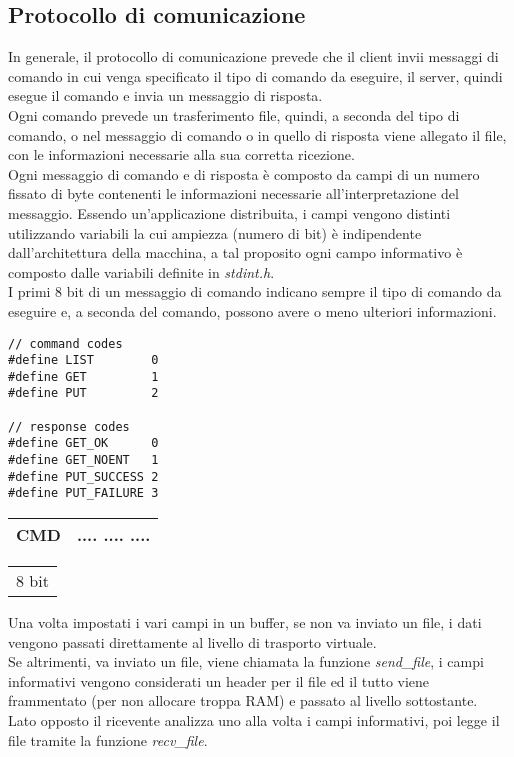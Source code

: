 \subsection{Protocollo di comunicazione}
In generale, il protocollo di comunicazione prevede che il client invii messaggi di comando in cui venga specificato il tipo di comando da eseguire, il server, quindi esegue il comando e invia un messaggio di risposta.\\
Ogni comando prevede un trasferimento file, quindi, a seconda del tipo di comando, o nel messaggio di comando o in quello di risposta viene allegato il file, con le informazioni necessarie alla sua corretta ricezione.\\
Ogni messaggio di comando e di risposta è composto da campi di un numero fissato di byte contenenti le informazioni necessarie all'interpretazione del messaggio.
Essendo un'applicazione distribuita, i campi vengono distinti utilizzando variabili la cui ampiezza (numero di bit) è indipendente dall'architettura della macchina, a tal proposito ogni campo informativo è composto dalle variabili definite in \emph{stdint.h}.\\ 
I primi 8 bit di un messaggio di comando indicano sempre il tipo di comando da eseguire e, a seconda del comando, possono avere o meno ulteriori informazioni.

\begin{lstlisting}[title=Costanti comandi]
// command codes
#define LIST 		0
#define GET 		1
#define PUT 		2

// response codes
#define GET_OK      0
#define GET_NOENT   1
#define PUT_SUCCESS 2
#define PUT_FAILURE 3
\end{lstlisting}


\renewcommand{\arraystretch}{1.5}
\begin{tabular}{|c|c|}
\hline
CMD &    ....    ....    ....    \\
\hline
\end{tabular}

\begin{tabular}{c}
8 bit 
\end{tabular}


Una volta impostati i vari campi in un buffer, se non va inviato un file, i dati vengono passati direttamente al livello di trasporto virtuale.\\
Se altrimenti, va inviato un file, viene chiamata la funzione \emph{send\_file}, i campi informativi vengono considerati un header per il file ed il tutto viene frammentato (per non allocare troppa RAM) e passato al livello sottostante.\\
Lato opposto il ricevente analizza uno alla volta i campi informativi, poi legge il file tramite la funzione \emph{recv\_file}.


